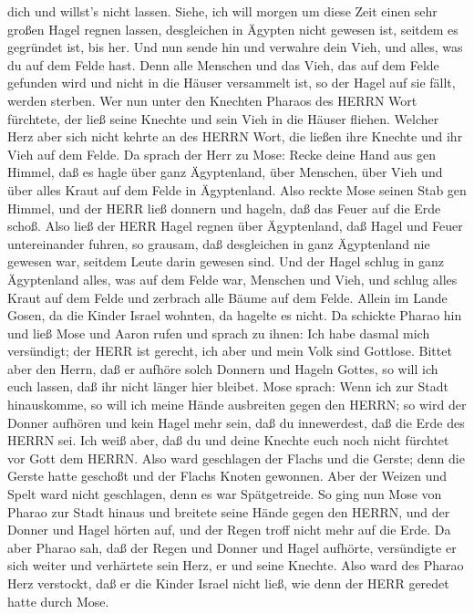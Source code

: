 dich und willst's nicht lassen.  Siehe, ich will morgen um
diese Zeit einen sehr großen Hagel regnen lassen, desgleichen in Ägypten
nicht gewesen ist, seitdem es gegründet ist, bis her.  Und
nun sende hin und verwahre dein Vieh, und alles, was du auf dem Felde
hast. Denn alle Menschen und das Vieh, das auf dem Felde gefunden wird
und nicht in die Häuser versammelt ist, so der Hagel auf sie fällt,
werden sterben.  Wer nun unter den Knechten Pharaos des
HERRN Wort fürchtete, der ließ seine Knechte und sein Vieh in die Häuser
fliehen.  Welcher Herz aber sich nicht kehrte an des HERRN
Wort, die ließen ihre Knechte und ihr Vieh auf dem Felde. 
Da sprach der Herr zu Mose: Recke deine Hand aus gen Himmel, daß es
hagle über ganz Ägyptenland, über Menschen, über Vieh und über alles
Kraut auf dem Felde in Ägyptenland.  Also reckte Mose
seinen Stab gen Himmel, und der HERR ließ donnern und hageln, daß das
Feuer auf die Erde schoß. Also ließ der HERR Hagel regnen über
Ägyptenland,  daß Hagel und Feuer untereinander fuhren, so
grausam, daß desgleichen in ganz Ägyptenland nie gewesen war, seitdem
Leute darin gewesen sind.  Und der Hagel schlug in ganz
Ägyptenland alles, was auf dem Felde war, Menschen und Vieh, und schlug
alles Kraut auf dem Felde und zerbrach alle Bäume auf dem Felde.
 Allein im Lande Gosen, da die Kinder Israel wohnten, da
hagelte es nicht.  Da schickte Pharao hin und ließ Mose und
Aaron rufen und sprach zu ihnen: Ich habe dasmal mich versündigt; der
HERR ist gerecht, ich aber und mein Volk sind Gottlose. 
Bittet aber den Herrn, daß er aufhöre solch Donnern und Hageln Gottes,
so will ich euch lassen, daß ihr nicht länger hier bleibet.
 Mose sprach: Wenn ich zur Stadt hinauskomme, so will ich
meine Hände ausbreiten gegen den HERRN; so wird der Donner aufhören und
kein Hagel mehr sein, daß du innewerdest, daß die Erde des HERRN sei.
 Ich weiß aber, daß du und deine Knechte euch noch nicht
fürchtet vor Gott dem HERRN.  Also ward geschlagen der
Flachs und die Gerste; denn die Gerste hatte geschoßt und der Flachs
Knoten gewonnen.  Aber der Weizen und Spelt ward nicht
geschlagen, denn es war Spätgetreide.  So ging nun Mose von
Pharao zur Stadt hinaus und breitete seine Hände gegen den HERRN, und
der Donner und Hagel hörten auf, und der Regen troff nicht mehr auf die
Erde.  Da aber Pharao sah, daß der Regen und Donner und
Hagel aufhörte, versündigte er sich weiter und verhärtete sein Herz, er
und seine Knechte.  Also ward des Pharao Herz verstockt,
daß er die Kinder Israel nicht ließ, wie denn der HERR geredet hatte
durch Mose.

